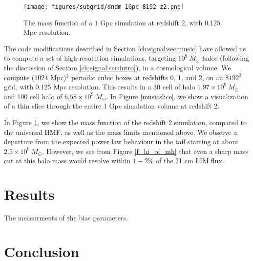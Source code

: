 \begin{figure}[h] %
\begin{center}
\texttt{[image: figures/subgrid/dndm\_1Gpc\_8192\_z2.png]}%
\caption{The mass function of a 1 Gpc simulation at redshift 2, with 0.125 Mpc resolution.}
\label{musicdndm}
\end{center}
\end{figure}

The code modifications described in Section \ref{ch:signal:sec:music} have allowed us to compute a set of high-resolution simulations, targeting $10^9~M_\odot$ halos (following the discussion of Section \ref{ch:signal:sec:intro}), in a cosmological volume. We compute (1024 Mpc)$^3$ periodic cubic boxes at redshifts 0, 1, and 2, on an $8192^3$ grid, with 0.125 Mpc resolution. This results in a 30 cell of halo $1.97 \times 10^{9}~M_\odot$ and 100 cell halo of $6.58 \times 10^{9}~M_\odot$. In Figure \ref{musicslice}, we show a visualization of a thin slice through the entire 1 Gpc simulation volume at redshift 2. 

In Figure \ref{musicdndm}, we show the mass function of the redshift 2 simulation, compared to the \citeauthor{tinker2008} universal HMF, as well as the mass limits mentioned above. We observe a departure from the expected power law behaviour in the tail starting at about $2.5 \times 10^{9}~M_\odot$. However, we see from Figure \ref{f_hi_of_mh} that even a sharp mass cut at this halo mass would resolve within $1-2 \%$ of the 21 cm LIM flux.

\section{Results}
\label{ch:signal:sec:results}

The measurments of the bias parameters.

\section{Conclusion}
\label{ch:signal:sec:conclusion}
